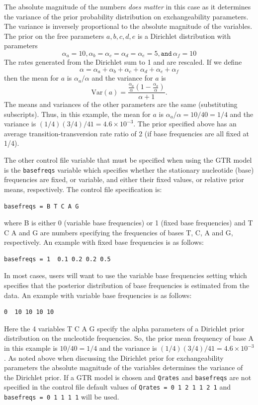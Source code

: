 \documentclass{book}
\numberwithin{equation}{section} \renewcommand{\baselinestretch}{0.55}
\begin{document}
The absolute magnitude of the numbers \emph{does matter} in this case
as it determines the variance of the prior probability distribution on
exchangeability parameters. The variance is inversely proportional to
the absolute magnitude of the variables. The prior on the free
parameters $a, b, c, d, e$ is a Dirichlet distribution with parameters
\begin{displaymath}
  \alpha_a = 10, \alpha_b = \alpha_c = \alpha_d = \alpha_e = 5, \texttt{and} \, \alpha_f = 10 
\end{displaymath}
The rates generated from the Dirichlet sum to 1 and are rescaled.  If
we define
\begin{displaymath}
  \alpha = \alpha_a + \alpha_b + \alpha_c + \alpha_d + \alpha_e + \alpha_f
\end{displaymath}
then the mean for $a$ is $\alpha_a/\alpha$ and the variance for $a$ is
\begin{displaymath}
  \textrm{Var}(a) = \frac{\frac{\alpha_a}{\alpha}\left(1-\frac{\alpha_a}{\alpha}\right)}{\alpha + 1}.
\end{displaymath}
The means and variances of the other parameters are the same
(substituting subscripts).  Thus, in this example, the mean for $a$ is
$\alpha_a/\alpha = 10/40 = 1/4$ and the variance is
$(1/4)(3/4)/41 = 4.6 \times 10^{-3}$.  The prior specified above has
an average transition-transversion rate ratio of 2 (if base
frequencies are all fixed at 1/4).

The other control file variable that must be specified when using the
GTR model is the \texttt{basefreqs} variable which specifies whether
the stationary nucleotide (base) frequencies are fixed, or variable,
and either their fixed values, or relative prior means,
respectively. The control file specification is:
\begin{verbatim}
basefreqs = B T C A G
\end{verbatim}
where B is either 0 (variable base frequencies) or 1 (fixed base
frequencies) and T C A and G are numbers specifying the frequencies of
bases T, C, A and G, respectively.  An example with fixed base
frequencies is as follows:
\begin{verbatim}
basefreqs = 1  0.1 0.2 0.2 0.5
\end{verbatim}
In most cases, users will want to use the variable base frequencies
setting which specifies that the posterior distribution of base
frequencies is estimated from the data. An example with variable base
frequencies is as follows:
\begin{verbatim}
0  10 10 10 10
\end{verbatim}
Here the 4 variables T C A G specify the alpha parameters of a
Dirichlet prior distribution on the nucleotide frequencies. So, the
prior mean frequency of base A in this example is $10/40 = 1/4$ and
the variance is $(1/4)(3/4)/41 = 4.6 \times 10^{-3}$. As noted above
when discussing the Dirichlet prior for exchangeability parameters the
absolute magnitude of the variables determines the variance of the
Dirichlet prior.
If a GTR model is chosen and \texttt{Qrates} and \texttt{basefreqs} are
not specified in the control file default values of \texttt{Qrates = 0 1 2 1 1 2 1}
and \texttt{basefreqs = 0 1 1 1 1} will be used.
\end{document}
